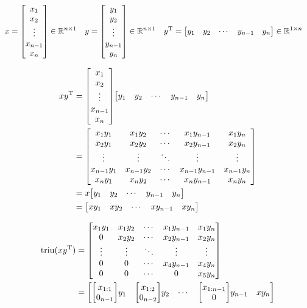 \documentclass[11pt]{article}
\newcommand{\triu}{\mathop{\mathrm{triu}}}
\newcommand{\T}{\mathrm{T}}
\begin{document}
\begin{align*}
    x &= \mqty[
        x_{1} \\
        x_{2} \\
        \vdots \\
        x_{n-1} \\
        x_{n}
        ]
    \in \mathbb{R}^{n \times 1}
    &
    y &= \mqty[
        y_{1} \\
        y_{2} \\
        \vdots \\
        y_{n-1} \\
        y_{n}
        ]
    \in \mathbb{R}^{n \times 1}
    &
    y^{\T} &= \mqty[
        y_{1} & y_{2} & \cdots & y_{n-1} & y_{n}
        ] \in \mathbb{R}^{1 \times n}
\end{align*}



\begin{align*}
    xy^{\T} &= \mqty[
        x_{1} \\
        x_{2} \\
        \vdots \\
        x_{n-1} \\
        x_{n}
        ]
        \mqty[
        y_{1} & y_{2} & \cdots & y_{n-1} & y_{n}
        ]\\
    &= \mqty[
        x_{1} y_{1} & x_{1} y_{2} & \cdots & x_{1} y_{n-1} & x_{1} y_{n}\\
        x_{2} y_{1} & x_{2} y_{2} & \cdots & x_{2} y_{n-1} & x_{2} y_{n}\\
        \vdots & \vdots & \ddots & \vdots & \vdots\\
        x_{n-1} y_{1} & x_{n-1} y_{2} & \cdots & x_{n-1} y_{n-1} & x_{n-1} y_{n}\\
        x_{n} y_{1} & x_{n} y_{2} & \cdots & x_{n} y_{n-1} & x_{n} y_{n}
        ]\\
    &= x\mqty[
            y_{1} & y_{2} & \cdots & y_{n-1} & y_{n}
            ]\\
    &= \mqty[
        xy_{1} & xy_{2} & \cdots & xy_{n-1} & xy_{n}
        ]
\end{align*}




\begin{align*}
    \triu(xy^{\T}) &= \mqty[
        x_{1} y_{1} & x_{1} y_{2} & \cdots & x_{1} y_{n-1} & x_{1} y_{n}\\
        0 & x_{2} y_{2} & \cdots & x_{2} y_{n-1} & x_{2} y_{n}\\
        \vdots & \vdots & \ddots & \vdots & \vdots\\
        0 & 0 & \cdots & x_{4} y_{n-1} & x_{4} y_{n}\\
        0 & 0 & \cdots & 0 & x_{5} y_{n}
        ]\\
    &= \mqty[
        \mqty[
            x_{1:1} \\
            0_{n-1}
            ]y_{1} &
        \mqty[
            x_{1:2} \\
            0_{n-2}
            ]y_{2} &
        \cdots &
        \mqty[
            x_{1:n-1} \\
            0
            ]y_{n-1} &
        x y_{n} 
        ]
\end{align*}
\end{document}
